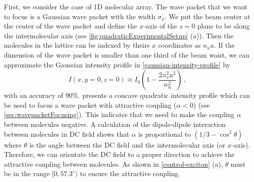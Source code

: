 First, we consider the case of 1D molecular array. The wave packet that we want to focus is a Gaussian wave packet
with the width $\sigma_x$. 
We put  the beam center at the center of the wave packet and define the $x$-axis of the $z=0$ plane to be along the intermolecular 
axis (see \autoref{fig:quadraticExperimentalSetup} (a)). Then the molecules in the lattice
can be indexed by theirs $x$ coordinates as $n_x a$. 
If the dimension of the wave packet is smaller than one third of the
beam waist, we can approximate the Gaussian intensity profile in
\autoref{gaussian-intensity-profile} by
\begin{equation}
I(x, y=0, z=0) \approx I_{0}\left(1- \frac{2 n_x^2 a^2}{w_0^2}\right) \ ,  \label{quadratic-profile-1D}
\end{equation}
with an accuracy of 90\%.  presents a concave quadratic intensity
profile which can be used to focus a wave packet with attractive
coupling ($\alpha < 0$) (see \autoref{sec:wavepacketFocusing}). This indicates that we need to make the coupling 
$\alpha$ between molecules negative. 
A calculation of the dipole-dipole interaction between molecules in DC field shows that $\alpha$ is proportional
to $(1/3 - \cos^2\theta)$ where $\theta$ is the angle between the DC field and the intermolecular axis 
(or $x$-axis). Therefore, we can orientate the DC field to a proper direction to achieve the attractive coupling 
between molecules. As shown in \autoref{control-exciton} (a), $\theta$ must be in the range  $[0, 57.3^{\circ})$
to ensure the attractive coupling. 

